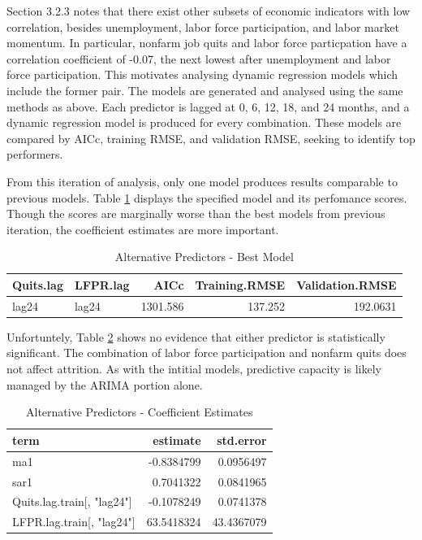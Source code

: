 \documentclass[12pt,letterpaper,toc=flat,oneside]{report}
\theoremstyle{definition}
\theoremstyle{definition}
\theoremstyle{definition}
\theoremstyle{remark}
\begin{document}
Section 3.2.3 notes that there exist other subsets of economic
indicators with low correlation, besides unemployment, labor force
participation, and labor market momentum. In particular, nonfarm job
quits and labor force particpation have a correlation coefficient of
-0.07, the next lowest after unemployment and labor force participation.
This motivates analysing dynamic regression models which include the
former pair. The models are generated and analysed using the same
methods as above. Each predictor is lagged at 0, 6, 12, 18, and 24
months, and a dynamic regression model is produced for every
combination. These models are compared by AICc, training RMSE, and
validation RMSE, seeking to identify top performers.

From this iteration of analysis, only one model produces results
comparable to previous models. Table \ref{tab:alt-indicators-1} displays
the specified model and its perfomance scores. Though the scores are
marginally worse than the best models from previous iteration, the
coefficient estimates are more important.

\begin{table}[!h]

\caption{\label{tab:alt-indicators-1}Alternative Predictors - Best Model}
\centering
\begin{tabular}[t]{llrrr}
\toprule
\bfseries{Quits.lag} & \bfseries{LFPR.lag} & \bfseries{AICc} & \bfseries{Training.RMSE} & \bfseries{Validation.RMSE}\\
\midrule
lag24 & lag24 & 1301.586 & 137.252 & 192.0631\\
\bottomrule
\end{tabular}
\end{table}

Unfortuntely, Table \ref{tab:alt-indicators-2} shows no evidence that
either predictor is statistically significant. The combination of labor
force participation and nonfarm quits does not affect attrition. As with
the intitial models, predictive capacity is likely managed by the ARIMA
portion alone.

\begin{table}[!h]

\caption{\label{tab:alt-indicators-2}Alternative Predictors - Coefficient Estimates}
\centering
\begin{tabular}[t]{lrr}
\toprule
\bfseries{term} & \bfseries{estimate} & \bfseries{std.error}\\
\midrule
ma1 & -0.8384799 & 0.0956497\\
sar1 & 0.7041322 & 0.0841965\\
Quits.lag.train[, "lag24"] & -0.1078249 & 0.0741378\\
LFPR.lag.train[, "lag24"] & 63.5418324 & 43.4367079\\
\bottomrule
\end{tabular}
\end{table}
\end{document}
